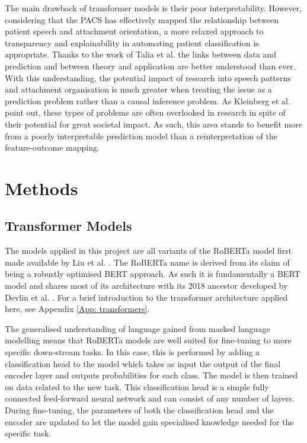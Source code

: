 \documentclass[12pt]{report}
\begin{document}
The main drawback of transformer models is their poor interpretability.
However, considering that the PACS has effectively mapped the relationship between patient speech and attachment orientation, a more relaxed approach to transparency and explainability in automating patient classification is appropriate.
Thanks to the work of Talia et al. \citeyear{Talia2017, Talia2014} the links between data and prediction and between theory and application are better understood than ever.
With this understanding, the potential impact of research into speech patterns and attachment organisation is much greater when treating the issue as a prediction problem rather than a causal inference problem.
As Kleinberg et al. \citeyear{PredictionPolicyProblems} point out, these types of problems are often overlooked in research in spite of their potential for great societal impact.
As such, this area stands to benefit more from a poorly interpretable prediction model than a reinterpretation of the feature-outcome mapping.

\section{Methods}

\subsection{Transformer Models}
The models applied in this project are all variants of the RoBERTa model first made available by Liu et al. \citeyear{roberta}.
The RoBERTa name is derived from its claim of being a robustly optimised BERT approach.
As such it is fundamentally a BERT model and shares most of its architecture with its 2018 ancestor developed by Devlin et al. \citeyear{BERT}.
For a brief introduction to the transformer architecture applied here, see Appendix \ref{App: transformers}.

The generalised understanding of language gained from masked language modelling means that RoBERTa models are well suited for fine-tuning to more specific down-stream tasks.
In this case, this is performed by adding a classification head to the model which takes as input the output of the final encoder layer and outputs probabilities for each class.
The model is then trained on data related to the new task.
This classification head is a simple fully connected feed-forward neural network and can consist of any number of layers.
During fine-tuning, the parameters of both the classification head and the encoder are updated to let the model gain specialised knowledge needed for the specific task.
\end{document}
